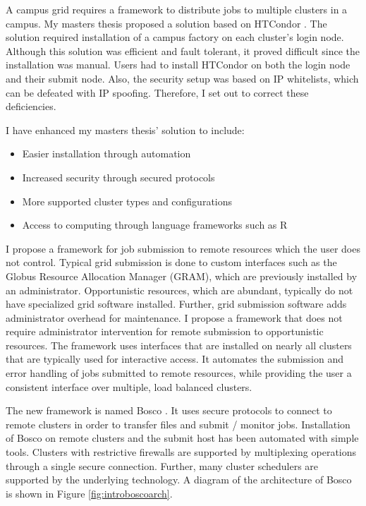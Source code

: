 A campus grid requires a framework to distribute jobs to multiple clusters in a campus.  My masters thesis \cite{weitzel2011campus} proposed a solution based on HTCondor \cite{litzkow1988condor}.  The solution required installation of a campus factory \cite{website:campusfactory} on each cluster's login node.  Although this solution was efficient and fault tolerant, it proved difficult since the installation was manual.  Users had to install HTCondor on both the login node and their submit node.  Also, the security setup was based on IP whitelists, which can be defeated with IP spoofing.  Therefore, I set out to correct these deficiencies.

I have enhanced my masters thesis' solution to include:
\begin{itemize}
\item Easier installation through automation
\item Increased security through secured protocols
\item More supported cluster types and configurations
\item Access to computing through language frameworks such as R \cite{team2005r}
\end{itemize}

I propose a framework for job submission to remote resources which the user does not control.  Typical grid submission is done to custom interfaces such as the Globus Resource Allocation Manager \cite{foster1999globus} (GRAM), which are previously installed by an administrator.  Opportunistic resources, which are abundant, typically do not have specialized grid software installed.  Further, grid submission software adds administrator overhead for maintenance.  I propose a framework that does not require administrator intervention for remote submission to opportunistic resources.  The framework uses interfaces that are installed on nearly all clusters that are typically used for interactive access.  It automates the submission and error handling of jobs submitted to remote resources, while providing the user a consistent interface over multiple, load balanced clusters.

The new framework is named Bosco \cite{chep2013weitzel}.  It uses secure protocols to connect to remote clusters in order to transfer files and submit / monitor jobs.  Installation of Bosco on remote clusters and the submit host has been automated with simple tools.  Clusters with restrictive firewalls are supported by multiplexing operations through a single secure connection.  Further, many cluster schedulers are supported by the underlying technology.  A diagram of the architecture of Bosco is shown in Figure \ref{fig:introboscoarch}.

